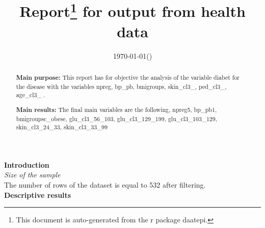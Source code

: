 \documentclass[12pt]{article}
\author{ }
\date{\today (\currenttime)}
\title{Report\footnote{This document is auto-generated from the r package daatepi.} for output from health data}
\begin{document}
\maketitle
\begin{abstract}
\noindent\textbf{Main purpose:}  This report has for objective the analysis of the variable  diabet  for the disease      with the variables  npreg, bp\_pb, bmigroups, skin\_cl3\_, ped\_cl3\_, age\_cl3\_  .
 
\noindent\textbf{Main results:} The final main variables are the following, npreg5, bp\_pb1, bmigroupsc\_obese, glu\_cl3\_56\_103, glu\_cl3\_129\_199, glu\_cl3\_103\_129, skin\_cl3\_24\_33, skin\_cl3\_33\_99
\end{abstract}
 
\noindent\textbf{Introduction}
~\\
 
\noindent\textit{Size of the sample}\\
\noindent The number of rows of the dataset is equal to 532 after filtering.
~\\
 
 
 
\newpage
\noindent \textbf{Descriptive results}
 
\end{document}
